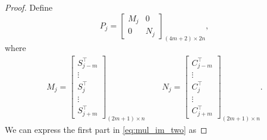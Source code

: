 \begin{proof}
Define
\begin{equation}
P_j = \left[ 
\begin{array}{ll}
M_j & 0 \\
0 & N_j 
\end{array}
\right]_{(4m+2)\times{2n}}, 
\end{equation}
where 
\begin{align}
M_j=\begin{bmatrix}
S_{j-m}^\top\\
\vdots \\
S_j^\top\\
\vdots \\
S_{j+m}^\top
\end{bmatrix}_{(2m+1)\times n}  \qquad
N_j =\begin{bmatrix}
C_{j-m}^\top\\
\vdots \\
C_j^\top\\
\vdots \\
C_{j+m}^\top
\end{bmatrix}_{(2m+1)\times n}. \nonumber 
\end{align}
We can express the first part in \eqref{eq:mul_im_two} as 


\end{proof}
